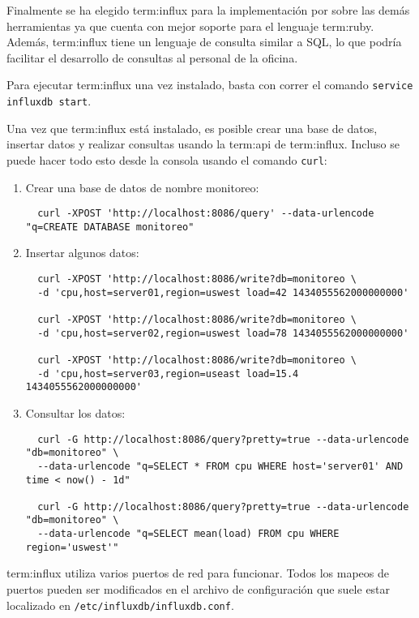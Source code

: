 Finalmente se ha elegido \gls{term:influx} para la implementación por sobre las
demás herramientas ya que cuenta con mejor soporte para el lenguaje
\gls{term:ruby}. Además, \gls{term:influx} tiene un lenguaje de consulta similar
a SQL, lo que podría facilitar el desarrollo de consultas al personal de la
oficina.

Para ejecutar \gls{term:influx} una vez instalado, basta con correr el comando
\lstinline{service influxdb start}.

Una vez que \gls{term:influx} está instalado, es posible crear una base de
datos, insertar datos y realizar consultas usando la \gls{term:api} de
\gls{term:influx}. Incluso se puede hacer todo esto desde la consola usando el
comando \lstinline{curl}:

\begin{enumerate}
  \item{Crear una base de datos de nombre monitoreo:}
  \begin{lstlisting}
  curl -XPOST 'http://localhost:8086/query' --data-urlencode "q=CREATE DATABASE monitoreo"
  \end{lstlisting}

  \item{Insertar algunos datos:}
  \begin{lstlisting}
  curl -XPOST 'http://localhost:8086/write?db=monitoreo \
  -d 'cpu,host=server01,region=uswest load=42 1434055562000000000'

  curl -XPOST 'http://localhost:8086/write?db=monitoreo \
  -d 'cpu,host=server02,region=uswest load=78 1434055562000000000'

  curl -XPOST 'http://localhost:8086/write?db=monitoreo \
  -d 'cpu,host=server03,region=useast load=15.4 1434055562000000000'
  \end{lstlisting}


  \item{Consultar los datos:}
  \begin{lstlisting}
  curl -G http://localhost:8086/query?pretty=true --data-urlencode "db=monitoreo" \
  --data-urlencode "q=SELECT * FROM cpu WHERE host='server01' AND time < now() - 1d"

  curl -G http://localhost:8086/query?pretty=true --data-urlencode "db=monitoreo" \
  --data-urlencode "q=SELECT mean(load) FROM cpu WHERE region='uswest'"
  \end{lstlisting}
\end{enumerate}

\gls{term:influx} utiliza varios puertos de red para funcionar. Todos los
mapeos de puertos pueden ser modificados en el archivo de configuración que
suele estar localizado en \texttt{/etc/influxdb/influxdb.conf}.

